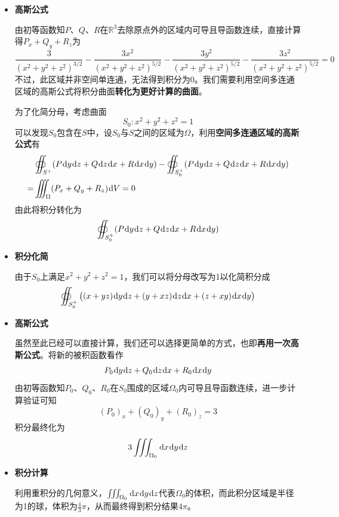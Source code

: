 \documentclass[a4paper,UTF8,fontset=windows,AutoFakeBold]{ctexart}
\newcommand*{\dr}{\hspace{0.07em}\mathrm{d}}
\newcommand*{\nv}{\vec{n}}
\newcommand*{\rb}{\mathbb{R}}
\theoremstyle{ex}
\begin{document}
\begin{enumerate}
\begin{itemize}
        利用第一型曲面积分与第二型曲面积分的关系可知
        $$\nv\dr S=(\dr y\dr z,\dr z\dr x,\dr x\dr y)$$
        由此原积分即化为($S$以外侧为正定向)
        $$\iint_{\Sigma^+}(P\dr y\dr z+Q\dr z\dr x+R\dr x\dr y)$$

        \item \textbf{高斯公式}
        
        由初等函数知$P$、$Q$、$R$在$\rb^3$去除原点外的区域内可导且导函数连续，直接计算得$P_x+Q_y+R_z$为
        $$\frac{3}{(x^2+y^2+z^2)^{3/2}}-\frac{3x^2}{(x^2+y^2+z^2)^{5/2}}-\frac{3y^2}{(x^2+y^2+z^2)^{5/2}}-\frac{3z^2}{(x^2+y^2+z^2)^{5/2}}=0$$
        不过，此区域并非空间单连通，无法得到积分为0。我们需要利用空间多连通区域的高斯公式将积分曲面\textbf{转化为更好计算的曲面}。

        为了化简分母，考虑曲面
        $$S_0\colon x^2+y^2+z^2=1$$
        可以发现$S_0$包含在$S$中，设$S_0$与$S$之间的区域为$\Omega$，利用\textbf{空间多连通区域的高斯公式}有
        $$\begin{aligned}&\oiint_{S^+}(P\dr y\dr z+Q\dr z\dr x+R\dr x\dr y)-\oiint_{S_0^+}(P\dr y\dr z+Q\dr z\dr x+R\dr x\dr y)\\=&\iiint_\Omega(P_x+Q_y+R_z)\dr V=0\end{aligned}$$
        由此将积分转化为
        $$\oiint_{S_0^+}(P\dr y\dr z+Q\dr z\dr x+R\dr x\dr y)$$

        \item \textbf{积分化简}
        
        由于$S_0$上满足$x^2+y^2+z^2=1$，我们可以将分母改写为1以化简积分成
        $$\oiint_{S_0^+}\big((x+yz)\dr y\dr z+(y+xz)\dr z\dr x+(z+xy)\dr x\dr y\big)$$
        
        \item \textbf{高斯公式}
        
        虽然至此已经可以直接计算，我们还可以选择更简单的方式，也即\textbf{再用一次高斯公式}。将新的被积函数看作
        $$P_0\dr y\dr z+Q_0\dr z\dr x+R_0\dr x\dr y$$
        由初等函数知$P_0$、$Q_0$、$R_0$在$S_0$围成的区域$\Omega_0$内可导且导函数连续，进一步计算验证可知
        $$(P_0)_x+(Q_0)_y+(R_0)_z=3$$
        积分最终化为
        $$3\iiint_{\Omega_0}\dr x\dr y\dr z$$

        \item \textbf{积分计算}

        利用重积分的几何意义，$\iiint_{\Omega_0}\dr x\dr y\dr z$代表$\Omega_0$的体积，而此积分区域是半径为1的球，体积为$\frac{4}{3}\pi$，从而最终得到积分结果$4\pi$。
        


\end{itemize}
\end{enumerate}
\end{document}
